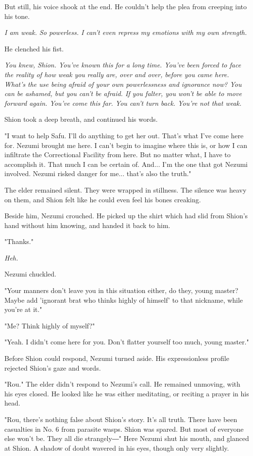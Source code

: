 But still, his voice shook at the end. He couldn't help the plea from
creeping into his tone.

\emph{I am weak. So powerless. I can't even repress my emotions with my own
strength.}

He clenched his fist.

\emph{You knew, Shion. You've known this for a long time. You've been forced
to face the reality of how weak you really are, over and over, before
you came here. What's the use being afraid of your own powerlessness and
ignorance \emph{now}? You can be ashamed, but you can't be afraid. If you
falter, you won't be able to move forward again. You've come this far.
You can't turn back. You're not that weak.}

Shion took a deep breath, and continued his words.

"I want to help Safu. I'll do anything to get her out. That's what I've
come here for. Nezumi brought me here. I can't begin to imagine where
this is, or how I can infiltrate the Correctional Facility from here.
But no matter what, I have to accomplish it. That much I can be certain
of. And... I'm the one that got Nezumi involved. Nezumi risked danger
for me... that's also the truth."

The elder remained silent. They were wrapped in stillness. The silence
was heavy on them, and Shion felt like he could even feel his bones
creaking.

Beside him, Nezumi crouched. He picked up the shirt which had slid from
Shion's hand without him knowing, and handed it back to him.

"Thanks."

\emph{Heh.}

Nezumi chuckled.

"Your manners don't leave you in this situation either, do they, young
master? Maybe add 'ignorant brat who thinks highly of himself' to that
nickname, while you're at it."

"Me? Think highly of myself?"

"Yeah. I didn't come here for you. Don't flatter yourself too much,
young master."

Before Shion could respond, Nezumi turned aside. His expressionless
profile rejected Shion's gaze and words.

"Rou." The elder didn't respond to Nezumi's call. He remained unmoving,
with his eyes closed. He looked like he was either meditating, or
reciting a prayer in his head.

"Rou, there's nothing false about Shion's story. It's all truth. There
have been casualties in No. 6 from parasite wasps. Shion was spared. But
most of everyone else won't be. They all die strangely―" Here Nezumi
shut his mouth, and glanced at Shion. A shadow of doubt wavered in his
eyes, though only very slightly.

